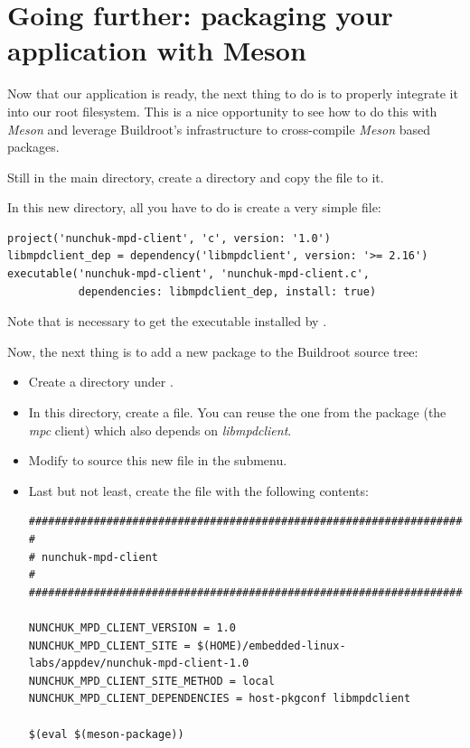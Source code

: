 \section{Going further: packaging your application with Meson}

Now that our application is ready, the next thing to do is to properly
integrate it into our root filesystem. This is a nice opportunity to see
how to do this with {\em Meson} and leverage Buildroot's
infrastructure to cross-compile {\em Meson} based packages.

Still in the main  directory, create a
 directory and copy the
 file to it.

In this new directory, all you have to do is create a very simple
 file:

\begin{verbatim}
project('nunchuk-mpd-client', 'c', version: '1.0')
libmpdclient_dep = dependency('libmpdclient', version: '>= 2.16')
executable('nunchuk-mpd-client', 'nunchuk-mpd-client.c',
           dependencies: libmpdclient_dep, install: true)
\end{verbatim}

Note that  is necessary to get the executable installed
by .

Now, the next thing is to add a new package to the Buildroot source
tree:
\begin{itemize}
\item Create a  directory under .
\item In this directory, create a  file. You can reuse
      the one from the  package (the {\em mpc} client)
      which also depends on {\em libmpdclient}.
\item Modify  to source this new file in the
       submenu.
\item Last but not least, create the  file
      with the following contents:
\begin{verbatim}
################################################################################
#
# nunchuk-mpd-client
#
################################################################################

NUNCHUK_MPD_CLIENT_VERSION = 1.0
NUNCHUK_MPD_CLIENT_SITE = $(HOME)/embedded-linux-labs/appdev/nunchuk-mpd-client-1.0
NUNCHUK_MPD_CLIENT_SITE_METHOD = local
NUNCHUK_MPD_CLIENT_DEPENDENCIES = host-pkgconf libmpdclient

$(eval $(meson-package))
\end{verbatim}
\end{itemize}

